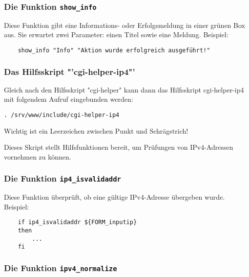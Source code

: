 \subsubsection{Die Funktion \texttt{show\_info}}

Diese Funktion gibt eine Informations- oder Erfolgsmeldung in einer grünen Box
aus. Sie erwartet zwei Parameter: einen Titel sowie eine Meldung. Beispiel:

\begin{example}
\begin{verbatim}
    show_info "Info" "Aktion wurde erfolgreich ausgeführt!"
\end{verbatim}
\end{example}

\subsubsection{Das Hilfsskript "'cgi-helper-ip4"'}

Gleich nach den Hilfsskript "cgi-helper" kann dann das Hilfsskript cgi-helper-ip4
mit folgendem Aufruf eingebunden werden:

\begin{example}
\begin{verbatim}
. /srv/www/include/cgi-helper-ip4
\end{verbatim}
\end{example}

Wichtig ist ein Leerzeichen zwischen Punkt und Schrägstrich!

Dieses Skript stellt Hilfsfunktionen bereit, um Prüfungen von IPv4-Adressen
vornehmen zu können.

\subsubsection{Die Funktion \texttt{ip4\_isvalidaddr}}

Diese Funktion überprüft, ob eine gültige IPv4-Adresse übergeben wurde.
Beispiel:

\begin{example}
\begin{verbatim}
    if ip4_isvalidaddr ${FORM_inputip}
    then
        ...
    fi
\end{verbatim}
\end{example}

\subsubsection{Die Funktion \texttt{ipv4\_normalize}}

